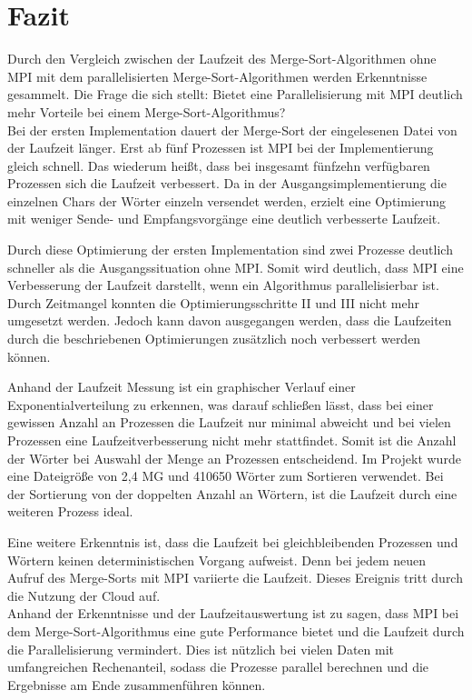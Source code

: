 \section{Fazit}
Durch den Vergleich zwischen der Laufzeit des Merge-Sort-Algorithmen ohne MPI mit dem parallelisierten Merge-Sort-Algorithmen werden Erkenntnisse gesammelt. Die Frage die sich stellt: Bietet eine Parallelisierung mit MPI deutlich mehr Vorteile bei einem Merge-Sort-Algorithmus?\\

Bei der ersten Implementation dauert der Merge-Sort der eingelesenen Datei von der Laufzeit länger. Erst ab fünf Prozessen ist MPI bei der Implementierung gleich schnell. Das wiederum heißt, dass bei insgesamt fünfzehn verfügbaren Prozessen sich die Laufzeit verbessert. Da in der Ausgangsimplementierung die einzelnen Chars der Wörter einzeln versendet werden, erzielt eine Optimierung mit weniger Sende- und Empfangsvorgänge eine deutlich verbesserte Laufzeit.

Durch diese Optimierung der ersten Implementation sind zwei Prozesse deutlich schneller als die Ausgangssituation ohne MPI. Somit wird deutlich, dass MPI eine Verbesserung der Laufzeit darstellt, wenn ein Algorithmus parallelisierbar ist. Durch Zeitmangel konnten die Optimierungsschritte II und III nicht mehr umgesetzt werden. Jedoch kann davon ausgegangen werden, dass die Laufzeiten durch die beschriebenen Optimierungen zusätzlich noch verbessert werden können.

Anhand der Laufzeit Messung ist ein graphischer Verlauf einer Exponentialverteilung zu erkennen, was darauf schließen lässt, dass bei einer gewissen Anzahl an Prozessen die Laufzeit nur minimal abweicht und bei vielen Prozessen eine Laufzeitverbesserung nicht mehr stattfindet. Somit ist die Anzahl der Wörter bei Auswahl der Menge an Prozessen entscheidend. Im Projekt wurde eine Dateigröße von 2,4 MG und 410650 Wörter zum Sortieren verwendet. Bei der Sortierung von der doppelten Anzahl an Wörtern, ist die Laufzeit durch eine weiteren Prozess ideal.

Eine weitere Erkenntnis ist, dass die Laufzeit bei gleichbleibenden Prozessen und Wörtern keinen deterministischen Vorgang aufweist. Denn bei jedem neuen Aufruf des Merge-Sorts mit MPI variierte die Laufzeit. Dieses Ereignis tritt durch die Nutzung der Cloud auf.\\

Anhand der Erkenntnisse und der Laufzeitauswertung ist zu sagen, dass MPI bei dem Merge-Sort-Algorithmus eine gute Performance bietet und die Laufzeit durch die Parallelisierung vermindert. Dies ist nützlich bei vielen Daten mit umfangreichen Rechenanteil, sodass die Prozesse parallel berechnen und die Ergebnisse am Ende zusammenführen können.